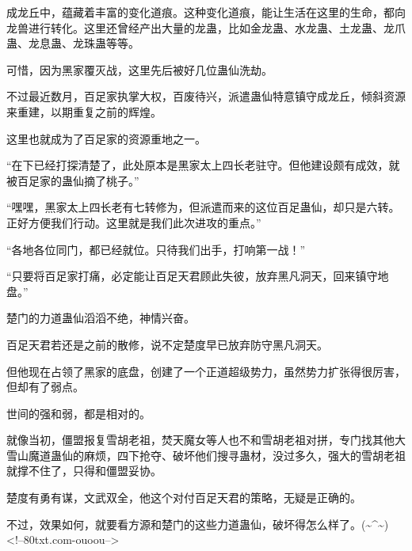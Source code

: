 \begin{this_body}
成龙丘中，蕴藏着丰富的变化道痕。这种变化道痕，能让生活在这里的生命，都向龙兽进行转化。这里还曾经产出大量的龙蛊，比如金龙蛊、水龙蛊、土龙蛊、龙爪蛊、龙息蛊、龙珠蛊等等。

可惜，因为黑家覆灭战，这里先后被好几位蛊仙洗劫。

不过最近数月，百足家执掌大权，百废待兴，派遣蛊仙特意镇守成龙丘，倾斜资源来重建，以期重复之前的辉煌。

这里也就成为了百足家的资源重地之一。

“在下已经打探清楚了，此处原本是黑家太上四长老驻守。但他建设颇有成效，就被百足家的蛊仙摘了桃子。”

“嘿嘿，黑家太上四长老有七转修为，但派遣而来的这位百足蛊仙，却只是六转。正好方便我们行动。这里就是我们此次进攻的重点。”

“各地各位同门，都已经就位。只待我们出手，打响第一战！”

“只要将百足家打痛，必定能让百足天君顾此失彼，放弃黑凡洞天，回来镇守地盘。”

楚门的力道蛊仙滔滔不绝，神情兴奋。

百足天君若还是之前的散修，说不定楚度早已放弃防守黑凡洞天。

但他现在占领了黑家的底盘，创建了一个正道超级势力，虽然势力扩张得很厉害，但却有了弱点。

世间的强和弱，都是相对的。

就像当初，僵盟报复雪胡老祖，焚天魔女等人也不和雪胡老祖对拼，专门找其他大雪山魔道蛊仙的麻烦，四下抢夺、破坏他们搜寻蛊材，没过多久，强大的雪胡老祖就撑不住了，只得和僵盟妥协。

楚度有勇有谋，文武双全，他这个对付百足天君的策略，无疑是正确的。

不过，效果如何，就要看方源和楚门的这些力道蛊仙，破坏得怎么样了。(\~{}\^{}\~{})<!--80txt.com-ouoou-->

\end{this_body}

